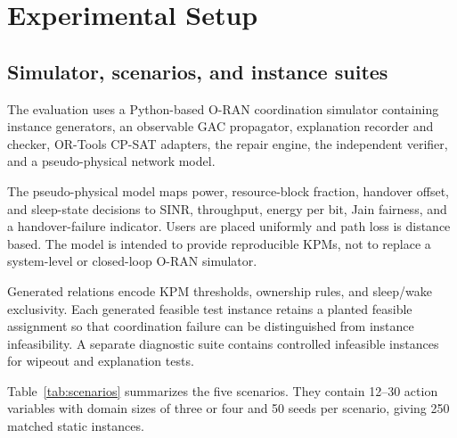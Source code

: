 \documentclass[pdflatex,sn-mathphys-num,iicol,oneside]{sn-jnl}
\newcommand{\gac}{\textsc{GAC}\xspace}
\newcommand{\cpsat}{\textsc{CP-SAT}\xspace}
\begin{document}
\section{Experimental Setup}
\label{sec:experiments}

\subsection{Simulator, scenarios, and instance suites}

The evaluation uses a Python-based O-RAN coordination simulator
containing instance generators, an observable \gac propagator,
explanation recorder and checker, OR-Tools \cpsat adapters, the repair
engine, the independent verifier, and a pseudo-physical network model.

The pseudo-physical model maps power, resource-block fraction,
handover offset, and sleep-state decisions to SINR, throughput, energy
per bit, Jain fairness, and a handover-failure indicator. Users are
placed uniformly and path loss is distance based. The model is
intended to provide reproducible KPMs, not to replace a system-level
or closed-loop O-RAN simulator.

Generated relations encode KPM thresholds, ownership rules, and
sleep/wake exclusivity. Each generated feasible test instance retains
a planted feasible assignment so that coordination failure can be
distinguished from instance infeasibility. A separate diagnostic suite
contains controlled infeasible instances for wipeout and explanation
tests.

Table~\ref{tab:scenarios} summarizes the five scenarios. They contain
12--30 action variables with domain sizes of three or four and 50
seeds per scenario, giving 250 matched static instances.
\end{document}
